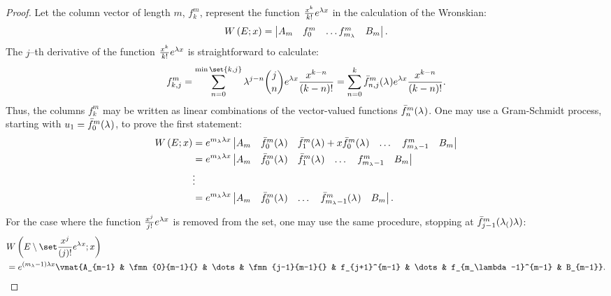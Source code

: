 \documentclass{book}
\begin{document}
\begin{proof}
Let the column vector of length $m$, $f_k^m$, represent the function $\Poly{k} e^{\lambda x}$ in the calculation of the Wronskian:
\begin{equation*}
\W{E}{x} = \begin{vmatrix} A_m & f_0^m & \dots f_{m_\lambda}^m & B_m \end{vmatrix} .
\end{equation*}
The $j$--th derivative of the function $\Poly{k} e^{\lambda x}$ is straightforward to calculate:
\begin{equation*}
f_{k,j}^m = \sum_{n=0}^{\min \set{k,j}} \lambda^{j-n} \binom{j}{n} e^{\lambda x} \poly{k-n} = \sum_{n=0}^k \fmn{n,j}{m}{} e^{\lambda x} \poly{k-n}.
\end{equation*}
Thus, the columns $f_k^m$ may be written as linear combinations of the vector-valued functions $\fmn{n}{m}{}$.
One may use a Gram-Schmidt process, starting with $u_1 = \fmn{0}{m}{}$, to prove the first statement:
\begin{equation*}
\begin{split}
\W{E}{x} & = e^{m_\lambda \lambda x} \begin{vmatrix} A_m & \fmn{0}{m}{} & \fmn{1}{m}{} + x \fmn{0}{m}{} & \dots & f_{m_\lambda-1}^m & B_m \end{vmatrix} \\
& = e^{m_\lambda \lambda x} \begin{vmatrix} A_m & \fmn{0}{m}{} & \fmn{1}{m}{} & \dots & f_{m_\lambda-1}^m & B_m \end{vmatrix} \\
& \vdots \\
& = e^{m_\lambda \lambda x} \begin{vmatrix} A_m & \fmn{0}{m}{} & \dots & \fmn{m_\lambda-1}{m}{} & B_m \end{vmatrix} .
\end{split}
\end{equation*}

For the case where the function $\Poly{j} e^{\lambda x}$ is removed from the set, one may use the same procedure, stopping at $\fmn{j-1}{m}(\lambda)$:
\begin{align*}
& \Wspec{j}{} \\
& = \eone \vmat{A_{m-1} & \fmn{0}{m-1}{} & \dots & \fmn{j-1}{m-1}{} & f_{j+1}^{m-1} & \dots & f_{m_\lambda-1}^{m-1} & B_{m-1}} .
\end{align*}


\end{proof}
\end{document}
